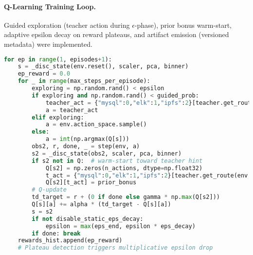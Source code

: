 \paragraph{Q-Learning Training Loop.}
Guided exploration (teacher action during $\epsilon$-phase), prior bonus warm-start, adaptive epsilon decay on reward plateaus, and artifact emission (versioned metadata) were implemented.
\begin{lstlisting}[language=Python,
    caption={Adaptive Q-Learning training fragment},
    label={lst:qtrain},
    breaklines=true,
    breakatwhitespace=true
]
for ep in range(1, episodes+1):
    s = _disc_state(env.reset(), scaler, pca, binner)
    ep_reward = 0.0
    for _ in range(max_steps_per_episode):
        exploring = np.random.rand() < epsilon
        if exploring and np.random.rand() < guided_prob:
            teacher_act = {"mysql":0,"elk":1,"ipfs":2}[teacher.get_route(env.current_log)]
            a = teacher_act
        elif exploring:
            a = env.action_space.sample()
        else:
            a = int(np.argmax(Q[s]))
        obs2, r, done, _ = step(env, a)
        s2 = _disc_state(obs2, scaler, pca, binner)
        if s2 not in Q:  # warm-start toward teacher hint
            Q[s2] = np.zeros(n_actions, dtype=np.float32)
            t_act = {"mysql":0,"elk":1,"ipfs":2}[teacher.get_route(env.current_log)]
            Q[s2][t_act] = prior_bonus
        # Q-update
        td_target = r + (0 if done else gamma * np.max(Q[s2]))
        Q[s][a] += alpha * (td_target - Q[s][a])
        s = s2
        if not disable_static_eps_decay:
            epsilon = max(eps_end, epsilon * eps_decay)
        if done: break
    rewards_hist.append(ep_reward)
    # Plateau detection triggers multiplicative epsilon drop
\end{lstlisting}

